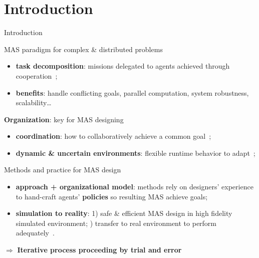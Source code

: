 \AtBeginSection[]{
    \begin{frame}
        \frametitle{}
        \tableofcontents[currentsection]
    \end{frame}
}


\section{Introduction}
\begin{frame}[allowframebreaks]{Introduction}

    \begin{block}{MAS paradigm for complex \& distributed problems}
        \begin{itemize}
            \item \textbf{task decomposition}: missions delegated to agents achieved through cooperation~\cite{Raileanu2023};
            \item \textbf{benefits}: handle conflicting goals, parallel computation, system robustness, scalability\dots
        \end{itemize}
    \end{block}

    \begin{block}{\textbf{Organization}: key for MAS designing}
        \begin{itemize}
            \item \textbf{coordination}: how to collaboratively achieve a common goal~\cite{Hubner2007};
            \item \textbf{dynamic \& uncertain environments}: flexible runtime behavior to adapt~\cite{Kathleen2020};
        \end{itemize}
    \end{block}

    \begin{block}{Methods and practice for MAS design}
        \begin{itemize}
            \item \textbf{approach + organizational model}: methods rely on designers' experience to hand-craft agents' \textbf{policies} so resulting MAS achieve goals;
            \item \textbf{simulation to reality}: 1) safe \& efficient MAS design in high fidelity simulated environment; ) transfer to real environment to perform adequately~\cite{Schon2021}.
        \end{itemize}
        \vspace{1ex}
        \quad $\Longrightarrow$ \textbf{Iterative process proceeding by trial and error}


\end{block}
\end{frame}
